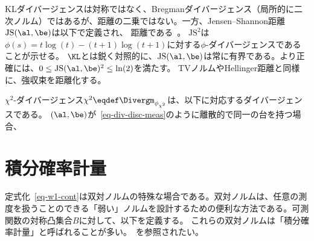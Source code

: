 \begin{example}
	KLダイバージェンスは対称ではなく、Bregmanダイバージェンス（局所的に二次ノルム）ではあるが、距離の二乗ではない。一方、Jensen--Shannon距離$\text{JS}(\al,\be)$は以下で定義され、
	距離である~\citep{endres2003new,osterreicher2003new}。
	$\text{JS}^2$は$\phi(s) = t\log(t)-(t+1)\log(t+1)$に対する$\phi$-ダイバージェンスであることが示せる。
	$\KL$とは鋭く対照的に、$\text{JS}(\al,\be)$は常に有界である。より正確には、$0 \leq \text{JS}(\al,\be)^2 \leq \ln(2)$を満たす。
	TVノルムやHellinger距離と同様に、強収束を距離化する。
\end{example}



\begin{example}[$\chi^2$]\label{exmp-chisquare}
	$\chi^2$-ダイバージェンス$\chi^2 \eqdef \Divergm_{\phi_{\chi^2}}$は、以下に対応するダイバージェンスである。
	$(\al,\be)$が~\eqref{eq-div-disc-meas}のように離散的で同一の台を持つ場合、
\end{example}


\section{積分確率計量}
\label{sec-dual-norms}


定式化~\eqref{eq-w1-cont}は双対ノルムの特殊な場合である。双対ノルムは、任意の測度を扱うことのできる「弱い」ノルムを設計するための便利な方法である。可測関数の対称凸集合$B$に対して、以下を定義する。
これらの双対ノルムは「積分確率計量」と呼ばれることが多い。~\citep{sriperumbudur2012empirical}を参照されたい。



